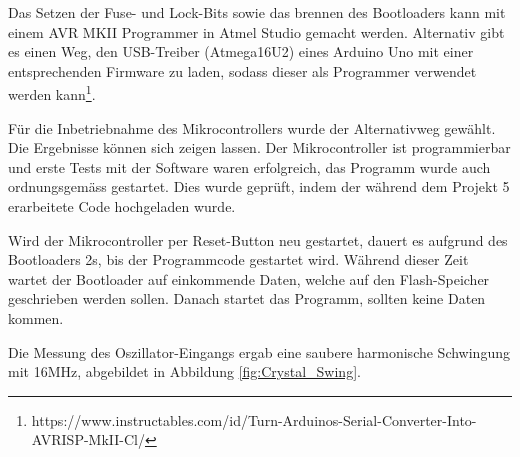 Das Setzen der Fuse- und Lock-Bits sowie das brennen des Bootloaders kann mit einem AVR MKII Programmer in Atmel Studio gemacht werden. Alternativ gibt es einen Weg, den USB-Treiber (Atmega16U2) eines Arduino Uno mit einer entsprechenden Firmware zu laden, sodass dieser als Programmer verwendet werden kann\footnote{https://www.instructables.com/id/Turn-Arduinos-Serial-Converter-Into-AVRISP-MkII-Cl/}.

Für die Inbetriebnahme des Mikrocontrollers wurde der Alternativweg gewählt. Die Ergebnisse können sich zeigen lassen. Der Mikrocontroller ist programmierbar und erste Tests mit der Software waren erfolgreich, das Programm wurde auch ordnungsgemäss gestartet. Dies wurde geprüft, indem der während dem Projekt 5 erarbeitete Code hochgeladen wurde.

Wird der Mikrocontroller per Reset-Button neu gestartet, dauert es aufgrund des Bootloaders 2s, bis der Programmcode gestartet wird. Während dieser Zeit wartet der Bootloader auf einkommende Daten, welche auf den Flash-Speicher geschrieben werden sollen. Danach startet das Programm, sollten keine Daten kommen.

Die Messung des Oszillator-Eingangs ergab eine saubere harmonische Schwingung mit 16MHz, abgebildet in Abbildung \ref{fig:Crystal_Swing}. 